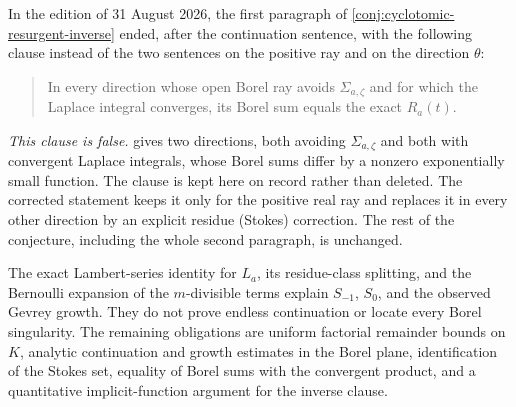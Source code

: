 \begin{historicalnote}
In the edition of 31 August 2026, the first paragraph of
\cref{conj:cyclotomic-resurgent-inverse} ended, after the continuation
sentence, with the following clause instead of the two sentences on the
positive ray and on the direction \(\theta\):
\begin{quote}
In every direction whose open Borel ray avoids \(\Sigma_{a,\zeta}\) and for
which the Laplace integral converges, its Borel sum equals the exact
\(R_a(t)\).
\end{quote}
\emph{This clause is false.}  
gives two directions, both avoiding \(\Sigma_{a,\zeta}\) and both with convergent
Laplace integrals, whose Borel sums differ by a nonzero exponentially small
function.  The clause is kept here on record rather than deleted.  The
corrected statement keeps it only for the positive real ray and replaces it in
every other direction by an explicit residue (Stokes) correction.  The rest of
the conjecture, including the whole second paragraph, is unchanged.
\end{historicalnote}

The exact Lambert-series identity for \(L_a\), its residue-class splitting,
and the Bernoulli expansion of the \(m\)-divisible terms explain
\(S_{-1}\), \(S_0\), and the observed Gevrey growth.  They do not prove
endless continuation or locate every Borel singularity.  The remaining
obligations are uniform factorial remainder bounds on \(K\), analytic
continuation and growth estimates in the Borel plane, identification of the
Stokes set, equality of Borel sums with the convergent product, and a
quantitative implicit-function argument for the inverse clause.

